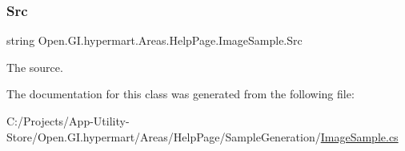 \subsubsection{\texorpdfstring{Src}{Src}}
{\footnotesize\ttfamily string Open.\+G\+I.\+hypermart.\+Areas.\+Help\+Page.\+Image\+Sample.\+Src\hspace{0.3cm}{\ttfamily [get]}}





The source. 

The documentation for this class was generated from the following file\+:\begin{DoxyCompactItemize}
\item 
C\+:/\+Projects/\+App-\/\+Utility-\/\+Store/\+Open.\+G\+I.\+hypermart/\+Areas/\+Help\+Page/\+Sample\+Generation/\hyperlink{_image_sample_8cs}{Image\+Sample.\+cs}\end{DoxyCompactItemize}
